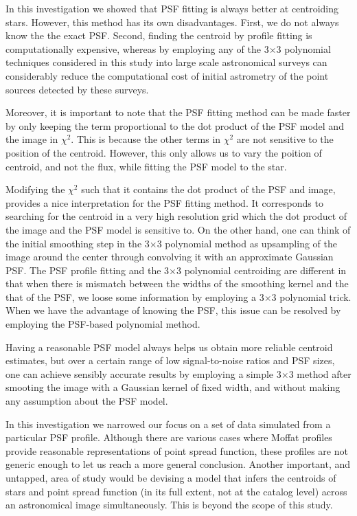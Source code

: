 \documentclass[12pt, preprint]{aastex}
\begin{document}
In this investigation we showed that PSF fitting is always better at centroiding stars.
However, this method has its own disadvantages. First, we do not always know the the exact PSF. Second, finding
 the centroid by profile fitting is computationally expensive, whereas by employing any of the 3$\times$3 polynomial techniques 
considered in this study into large scale astronomical surveys can considerably reduce the computational cost
of initial astrometry of the point sources detected by these surveys. 

Moreover, it is important to note that the PSF fitting method can be made faster by only keeping the 
term proportional to the dot product of the PSF model and the image in $\chi^2$. This is because 
the other terms in $\chi^{2}$ are not sensitive to the position of the centroid. However, this only allows
us to vary the poition of centroid, and not the flux, while fitting the PSF model
to the star. 

Modifying the $\chi^2$ such that it contains the dot product of the PSF and image, 
provides a nice interpretation for the PSF fitting method. It corresponds to searching for the 
centroid in a very high resolution grid which the dot product of the image and the PSF model is
sensitive to. On the other hand, one can think of the initial smoothing step in the 3$\times$3 polynomial method 
as upsampling of the image around the center through convolving it with an approximate Gaussian PSF. 
The PSF profile fitting and the 3$\times$3 polynomial centroiding are different in that when there is mismatch between the
widths of the smoothing kernel and the that of the PSF, we loose some information by employing a 3$\times$3 polynomial trick.
When we have the advantage of knowing the PSF, this issue can be resolved by employing the PSF-based polynomial method.

Having a reasonable PSF model always helps us obtain more reliable centroid estimates, but
over a certain range of low signal-to-noise ratios and PSF sizes, one can achieve sensibly
 accurate results by employing a simple 3$\times$3 method after smooting the image with
 a Gaussian kernel of fixed width, and without making any assumption about the PSF model.

In this investigation we narrowed our focus on a set of data simulated from a particular
PSF profile. Although there are various cases where Moffat profiles provide reasonable
representations of point spread function, these profiles are not generic enough to let us
reach a more general conclusion. Another important, and untapped, area of study
would be devising a model that infers the centroids of stars and point spread function
(in its full extent, not at the catalog level) across an astronomical image simultaneously.
This is beyond the scope of this study. 
\end{document}
